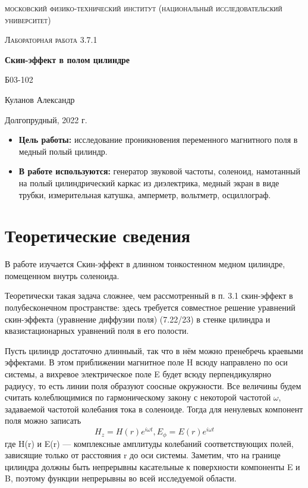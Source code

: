 \documentclass[a4paper, 12pt]{article}
\begin{document}
\begin{titlepage}
	\centering
	\vspace{5cm}
	{\scshape\LARGE московский физико-технический институт (национальный исследовательский университет) \par}
	\vspace{6cm}
	{\scshape\Large Лабораторная работа 3.7.1 \par}
	{\huge\bfseries Скин-эффект в полом цилиндре \par}
	\vspace{1cm}
	\vfill
\begin{flushright}
	{\large Б03-102}\par
	\vspace{0.3cm}
	{\LARGE Куланов Александр}
\end{flushright}
	

	\vfill


	Долгопрудный, 2022 г.
\end{titlepage}

\begin{itemize}
	\item \textbf{Цель работы:} исследование проникновения переменного магнитного поля в медный полый цилиндр.
    \item \textbf{В работе используются:} генератор звуковой частоты, соленоид, намотанный на полый цилиндрический каркас из диэлектрика, медный экран в виде трубки, измерительная катушка, амперметр, вольтметр, осциллограф.
\end{itemize}

\section{Теоретические сведения}
В работе изучается Скин-эффект в длинном тонкостенном медном цилиндре, помещенном внутрь соленоида.

Теоретически такая задача сложнее, чем рассмотренный в п. 3.1 скин-эффект в полубесконечном пространстве: здесь требуется совместное решение уравнений скин-эффекта (уравнение диффузии поля)
(7.22/23) в стенке цилиндра и квазистационарных уравнений поля в его полости.

Пусть цилиндр достаточно длинныый, так что в нём можно пренебречь краевыми эффектами. В этом приближении магнитное поле H всюду направлено по оси системы, а вихревое электрическое поле E
будет всюду перпендикулярно радиусу, то есть линии поля образуют соосные окружности. Все величины будем считать колеблющимися по гармоническому закону с некоторой частотой $\omega$,
задаваемой частотой колебания тока в соленоиде. Тогда для ненулевых компонент поля можно записать 
$$ H_z = H(r)e^{i\omega t}, E_{\phi} = E(r)e^{i\omega t} $$
где H(r) и E(r) --- комплексные амплитуды колебаний соответствующих полей, зависящие только от расстояния r до оси системы. Заметим, что на границе цилиндра должны быть непрерывны
касательные к поверхности компоненты E и B, поэтому функции непрерывны во всей исследуемой области.
\end{document}
